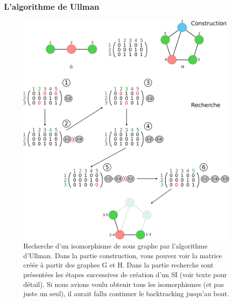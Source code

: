 \documentclass[12pt,french,twoside]{report}
\begin{document}
\subsubsection{L'algorithme de Ullman}

\begin{figure}[!ht]
  \begin{center}
    \includegraphics[width=450px]{Figures/s2m/MCS-SI/ullman.png}
    \caption{\label{ullman_fig}Recherche d'un isomorphisme de sous graphe par l'algorithme d'Ullman.
    Dans la partie construction, vous pouvez voir la matrice créée à partir des graphes G et H.
    Dans la partie recherche sont présentées les étapes successives de création d'un SI (voir texte pour détail).
    Si nous avions voulu obtenir tous les isomorphismes (et pas juste un seul), il aurait fallu continuer le backtracking jusqu'au bout.}
  \end{center}
\end{figure}
\end{document}

